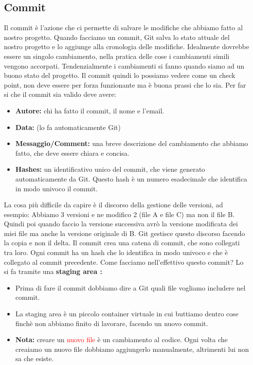 \documentclass[a4paper,12pt]{article}
\begin{document}
\subsection{Commit}
Il commit è l'azione che ci permette di salvare le modifiche che abbiamo fatto al nostro progetto. Quando facciamo un commit, Git salva lo stato attuale del nostro progetto e lo aggiunge alla cronologia delle modifiche.
Idealmente dovrebbe essere un singolo cambiamento, nella pratica delle cose i cambiamenti simili vengono accorpati. Tendenzialmente i cambiamenti si fanno quando siamo ad un buono stato
del progetto. Il commit quindi lo possiamo vedere come un check point, non deve essere per forza funzionante ma è buona prassi che lo sia.
Per far si che il commit sia valido deve avere:
\begin{itemize}
    \item \textbf{Autore: } chi ha fatto il commit, il nome e l'email.
    \item \textbf{Data: } (lo fa automaticamente Git)
    \item \textbf{Messaggio/Comment: } una breve descrizione del cambiamento che abbiamo fatto, che deve essere chiara e concisa.
    \item \textbf{Hashes: } un identificativo unico del commit, che viene generato automaticamente da Git. Questo hash è un numero esadecimale che identifica in modo univoco il commit.
\end{itemize}
La cosa più difficile da capire è il discorso della gestione delle versioni, ad esempio: Abbiamo 3 versioni e ne modifico 2 (file A e file C) ma non il file B.
Quindi poi quando faccio la versione successiva avrò la versione modificata dei miei file ma anche la versione originale di B. 
Git gestisce questo discorso facendo la copia e non il delta.
Il commit crea una catena di commit, che sono collegati tra loro. Ogni commit ha un hash che lo identifica in modo univoco e che è collegato al commit precedente.
Come facciamo nell'effettivo questo commit? Lo si fa tramite una \textbf{staging area :}
\begin{itemize}
    \item Prima di fare il commit dobbiamo dire a Git quali file vogliamo includere nel commit.
    \item La staging area è un piccolo container virtuale in cui buttiamo dentro cose finchè non abbiamo finito di lavorare, facendo un nuovo commit.
    \item \textbf{Nota: }creare un \textcolor{red}{nuovo file} è un cambiamento al codice. Ogni volta che creaiamo un nuovo file dobbiamo aggiungerlo manualmente, altrimenti lui non sa che esiste.
\end{itemize}
\end{document}
